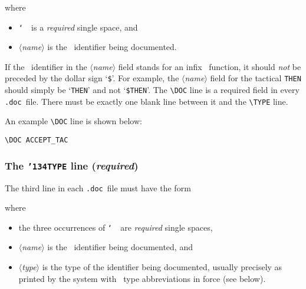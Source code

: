 \documentclass[12pt]{article}
\def\doc{{\tt .doc}}
\def\vsp{{\tt\char`\ }}
\def\meta#1{\(\langle\){\it #1}\(\rangle\)}
\begin{document}
\noindent where

\begin{itemize}

\item \vsp\ is a {\it required\/} single space, and

\item \meta{name} is the \ML\ identifier being documented.

\end{itemize}

\noindent If the \ML\ identifier in the \meta{name} field stands for an infix
\ML\ function, it should {\it not\/} be preceded by the dollar sign
`{\small\verb!$!}'.  For example, the \meta{name} field for the tactical
{\small\verb!THEN!} should simply be `{\small\verb!THEN!}' and not
`{\small\verb!$THEN!}'.  The {\small\verb!\DOC!} line is a required field in
every \doc\ file.  There must be exactly one blank line between it and the
{\small\verb!\TYPE!} line.

An example {\small\verb!\DOC!} line is shown below:

\begin{boxed}\begin{verbatim}
\DOC ACCEPT_TAC
\end{verbatim}\end{boxed}

\subsubsection{The {\tt {\char'134}TYPE} line ({\it required})}

The third line in each \doc\ file must have the form

\medskip
\noindent\qquad{\small\verb!\TYPE!\vsp\verb!{!\meta{name}\vsp\ml{:}\vsp\meta{type}\verb!}!}
\medskip

\noindent where

\begin{itemize}

\item the three occurrences of \vsp\ are {\it required\/} single spaces,
\item \meta{name} is the \ML\ identifier being documented, and
\item \meta{type} is the type of the identifier being documented, usually
precisely as printed by the system with \ML\ type abbreviations in force (see
below).

\end{itemize}
\end{document}
